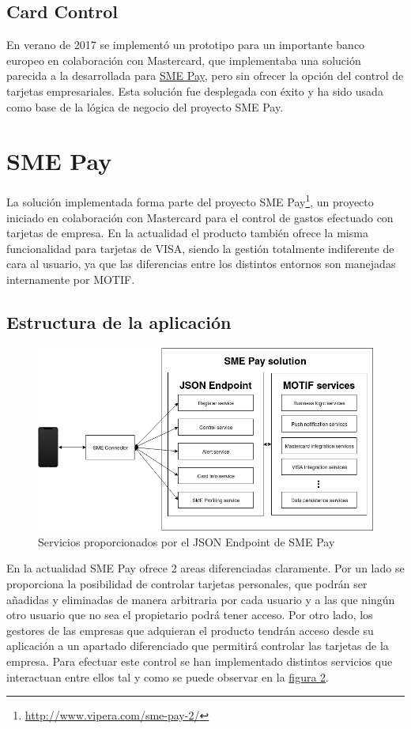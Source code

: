 \documentclass[a4paper, 12pt]{article}
\begin{document}
\subsection{Card Control}
\label{sec-2-4}
En verano de 2017 se implementó un prototipo para un importante banco europeo en colaboración con Mastercard, que implementaba una solución parecida
a la desarrollada para \hyperref[sec:smepay]{SME Pay}, pero sin ofrecer la opción del control de tarjetas empresariales. Esta solución fue desplegada con éxito
y ha sido usada como base de la lógica de negocio del proyecto SME Pay.
\section{SME Pay}
\label{sec-3}
\label{sec:smepay}
La solución implementada forma parte del proyecto SME Pay\footnote{\url{http://www.vipera.com/sme-pay-2/}}, un proyecto iniciado en colaboración con Mastercard para el control
de gastos efectuado con tarjetas de empresa. En la actualidad el producto también ofrece la misma funcionalidad para tarjetas de VISA,
siendo la gestión totalmente indiferente de cara al usuario, ya que las diferencias entre los distintos entornos son manejadas internamente
por MOTIF.
\subsection{Estructura de la aplicación}
\label{sec-3-1}
\begin{figure}[htb]
\centering
\includegraphics[width=.9\linewidth]{./images/smepay.png}
\caption{\label{fig:sme-services}Servicios proporcionados por el JSON Endpoint de SME Pay}
\end{figure}
En la actualidad SME Pay ofrece 2 areas diferenciadas claramente. Por un lado se proporciona la posibilidad de controlar tarjetas personales,
que podrán ser añadidas y eliminadas de manera arbitraria por cada usuario y a las que ningún otro usuario que no sea el propietario podrá tener
acceso. Por otro lado, los gestores de las empresas que adquieran el producto tendrán acceso desde su aplicación a un apartado diferenciado que
permitirá controlar las tarjetas de la empresa. Para efectuar este control se han implementado distintos servicios que interactuan entre ellos
tal y como se puede observar en la \hyperref[fig:sme-services]{figura 2}.
\end{document}
